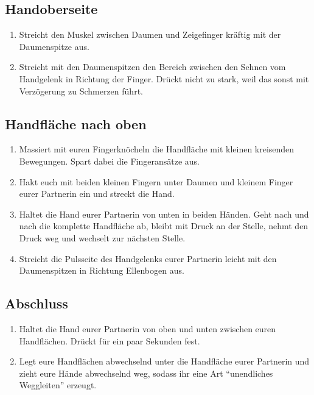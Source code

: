\subsection{Handoberseite}
\begin{enumerate}
  \item {} Streicht den Muskel zwischen Daumen und Zeigefinger kräftig mit der Daumenspitze aus.
  \item {} Streicht mit den Daumenspitzen  den Bereich zwischen den Sehnen vom Handgelenk in Richtung der Finger. Drückt nicht zu stark, weil das sonst mit Verzögerung zu Schmerzen führt.
\end{enumerate}

\subsection{Handfläche nach oben}
\begin{enumerate}
  \item {} Massiert mit euren Fingerknöcheln die Handfläche mit kleinen kreisenden Bewegungen. Spart dabei die Fingeransätze aus.
  \item {} Hakt euch mit beiden kleinen Fingern unter Daumen und kleinem Finger eurer Partnerin ein und streckt die Hand.
  \item {} Haltet die Hand eurer Partnerin von unten in beiden Händen. Geht nach und nach die komplette Handfläche ab, bleibt mit Druck an der Stelle, nehmt den Druck weg und wechselt zur nächsten Stelle.
  \item {} Streicht die Pulsseite des Handgelenks eurer Partnerin leicht mit den Daumenspitzen in Richtung Ellenbogen aus.
\end{enumerate}

\subsection{Abschluss}
\begin{enumerate}
  \item {} Haltet die Hand eurer Partnerin von oben und unten zwischen euren Handflächen. Drückt für ein paar Sekunden fest.
  \item {} Legt eure Handflächen abwechselnd unter die Handfläche eurer Partnerin und zieht eure Hände abwechselnd weg, sodass ihr eine Art "`unendliches Weggleiten"' erzeugt.
\end{enumerate}
